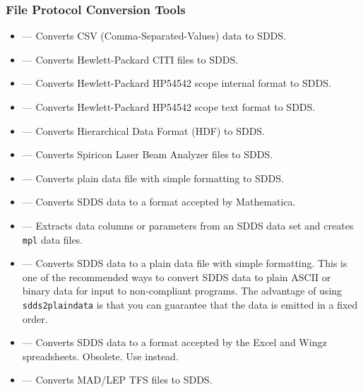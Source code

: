 \documentclass[11pt]{article}
\begin{document}
\subsubsection{File Protocol Conversion Tools}

\begin{itemize}
\item {} --- Converts CSV (Comma-Separated-Values) data to SDDS.

\item {} --- Converts Hewlett-Packard CITI files to SDDS.

\item {} --- Converts Hewlett-Packard HP54542 scope internal format to SDDS.

\item {} --- Converts Hewlett-Packard HP54542 scope text format to SDDS.

\item {} --- Converts Hierarchical Data Format (HDF) to SDDS.

\item {} --- Converts Spiricon Laser Beam Analyzer files to SDDS.

\item {} --- Converts plain data file with simple formatting to SDDS.

\item {} --- Converts SDDS data to a format accepted by Mathematica.

\item {} --- Extracts data columns or parameters from an SDDS data set and creates \verb|mpl| data
files\cite{thesis}.

\item {} --- Converts SDDS data to a plain data file with simple formatting.  This is
one of the recommended ways to convert SDDS data to plain ASCII or binary data for input to non-compliant
programs.  The advantage of using \verb|sdds2plaindata| is that you can guarantee that the data is 
emitted in a fixed order.

\item {} --- Converts SDDS data to a format accepted by the Excel and Wingz spreadsheets.
Obsolete.  Use  instead.

\item {} --- Converts MAD/LEP TFS files to SDDS.

\end{itemize}
\end{document}
